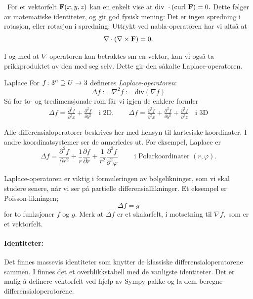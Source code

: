 \begin{oppsum}\,
For et vektorfelt $\mathbf{F}(x,y,z)$ kan en enkelt vise at $\text{div }\cdot(\text{curl }\mathbf{F})=0.$ Dette følger av matematiske identiteter, og gir god fysisk mening: Det er ingen spredning i rotasjon, eller rotasjon i spredning. Uttrykt ved nabla-operatoren har vi altså at
\[\nabla\cdot\left(\nabla\times\mathbf{F}\right)=0.\]
\end{oppsum}
I og med at $\nabla$-operatoren kan betraktes sm en vektor, kan vi også ta prikkproduktet av den med seg selv. Dette gir den såkalte Laplace-operatoren.

\begin{defn}{Laplace}
For $f\colon 3^n\supseteq U \rightarrow 3$ defineres \emph{Laplace-operatoren}:
\[
\Delta f := \nabla^2 f := \text{div}(\nabla f)
\]
Så for to- og tredimensjonale rom får vi igjen de enklere formler
\begin{align*}
 \Delta f = \frac{\partial^2 f}{\partial^2 x} + \frac{\partial^2f}{\partial y^2} \quad \text{i 2D}, \qquad
 \Delta f = \frac{\partial^2 f}{\partial^2 x} + \frac{\partial^2f}{\partial y^2} +  \frac{\partial^2 f}{\partial^2 z} \quad \text{i 3D}
\end{align*}
\end{defn}
\begin{rem}{}
Alle differensialoperatorer beskrives her med hensyn til kartesiske koordinater. I andre koordinatsystemer ser de annerledes ut. For eksempel, Laplace er 
\[\Delta f = \frac{\partial^2 f}{\partial r^2} + \frac{1}{r}\frac{\partial f}{\partial r} + \frac{1}{r^2} \frac{\partial^2 f}{\partial^2 \varphi}\qquad \text{ i Polarkoordinater } (r,\varphi).\]
\end{rem}
Laplace-operatoren er viktig i formuleringen av bølgelikninger, som vi skal studere senere, når vi ser på partielle differensiallikninger. Et eksempel er Poisson-likningen; 
\[\Delta f=g\]
for to funksjoner $f$ og $g$. Merk at $\Delta f$ er et skalarfelt, i motsetning til $\nabla f, $ som er et vektorfelt.

\paragraph{Identiteter: }Det finnes massevis identiteter som knytter de klassiske differensialoperatorene sammen. I  finnes det et overblikkstabell med de vanligste identiteter.
Det er mulig å definere vektorfelt ved hjelp av Sympy pakke og la dem beregne differensialoperatorene.

